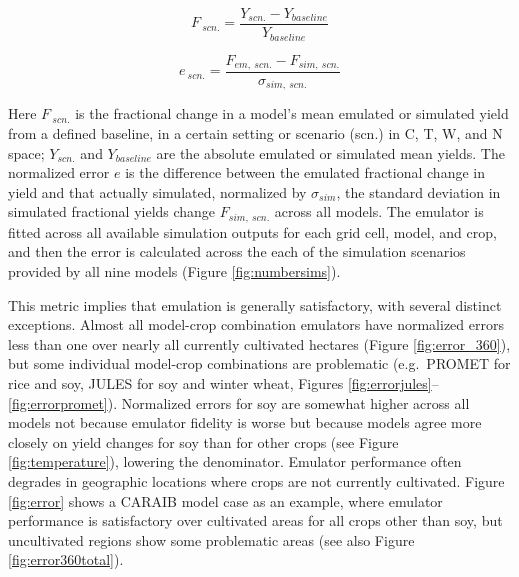 \documentclass[esd, final]{copernicus} %
\begin{document}
\begin{equation}
    \label{eqn:per_yield}
    F_{\: scn.}=\frac{Y_{scn.}-Y_{baseline}}{Y_{baseline}}
\end{equation}

\begin{equation}
    \label{eqn:error}
    e_{\: scn.} =\frac{F_{em, \: scn.}-F_{sim, \: scn.}}{\sigma_{sim, \: scn.}}
\end{equation}

Here $F_{\: scn.}$ is the fractional change in a model's mean emulated or simulated yield from a defined baseline, in a certain setting or scenario (scn.) in C, T, W, and N space; $Y_{scn.}$ and $Y_{baseline}$ are the absolute emulated or simulated mean yields. The normalized error $e$ is the difference between the emulated fractional change in yield and that actually simulated, normalized by $\sigma_{sim}$, the standard deviation in simulated fractional yields change $F_{sim,\: scn.}$ across all models. The emulator is fitted across all available simulation outputs for each grid cell, model, and crop, and then the error is calculated across the each of the simulation scenarios provided by all nine models (Figure \ref{fig:numbersims}). 

This metric implies that emulation is generally satisfactory, with several distinct exceptions. Almost all model-crop combination emulators have normalized errors less than one over nearly all currently cultivated hectares (Figure \ref{fig:error_360}), but some individual model-crop combinations are problematic (e.g.\ PROMET for rice and soy, JULES for soy and winter wheat, Figures \ref{fig:errorjules}--\ref{fig:errorpromet}). Normalized errors for soy are somewhat higher across all models not because emulator fidelity is worse but because models agree more closely on yield changes for soy than for other crops (see Figure \ref{fig:temperature}), lowering the denominator. Emulator performance often degrades in geographic locations where crops are not currently cultivated. Figure \ref{fig:error} shows a CARAIB model case as an example, where emulator performance is satisfactory over cultivated areas for all crops other than soy, but uncultivated regions show some problematic areas (see also Figure \ref{fig:error360total}).
\end{document}
